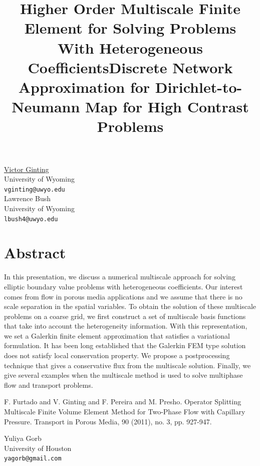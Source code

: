 \documentclass[article, A4, 11pt]{llncs}%
\begin{document}
\title{Higher Order Multiscale Finite Element for Solving Problems With Heterogeneous Coefficients}
 \author{} \institute{}
\maketitle
\begin{center}
{\large \underline{Victor Ginting}}\\
University of Wyoming\\
{\tt vginting@uwyo.edu}
\\ \vspace{4mm}
{\large Lawrence  Bush}\\
University of Wyoming\\
{\tt lbush4@uwyo.edu}
\end{center}

\section*{Abstract}
In this presentation, we discuss a numerical multiscale approach for solving elliptic boundary value problems with heterogeneous coefficients. Our interest comes from flow in porous media applications and we assume that there is no scale separation in the spatial variables. To obtain the solution of these multiscale problems on a coarse grid, we first construct a set of multiscale basis functions that take into account the heterogeneity information. With this representation, we set a Galerkin finite element approximation that satisfies a variational formulation. It has been long established that the Galerkin FEM type solution does not satisfy local conservation property. We propose a postprocessing technique that gives a conservative flux from the multiscale solution. Finally, we give several examples when the multiscale method is used to solve multiphase flow and transport problems. 


\begin{thebibliography}{10}
{\sc F. Furtado and V. Ginting and F. Pereira and M. Presho}. {Operator Splitting Multiscale Finite Volume Element Method for Two-Phase Flow with Capillary Pressure}. Transport in Porous Media, 90 (2011), no. 3, pp. 927-947.
\end{thebibliography} %

\title{Discrete Network Approximation for Dirichlet-to-Neumann Map for High Contrast Problems}
 \author{} \institute{}
\maketitle
\begin{center}
{\large Yuliya Gorb}\\
University of Houston\\
{\tt yagorb@gmail.com}
\end{center}
\end{document}
